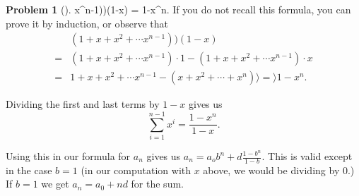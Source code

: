 \documentclass[10pt,]{book}
\theoremstyle{plain}
\theoremstyle{definition}
\newtheorem{activity}[project]{Problem}
\theoremstyle{definition}
\numberwithin{equation}{chapter}
\newcommand{\amp}{&}
\begin{document}
\begin{activity}[]
x^{n-1}))(1-x) = 1-x^n\). If you do not recall this formula, you can prove it by induction, or observe that%
\begin{align*}
\amp (1+x+x^2+\cdots
x^{n-1}))(1-x)\\
=\amp  (1+x+x^2+\cdots
x^{n-1})\cdot 1-(1+x+x^2+\cdots
x^{n-1})\cdot x\\
=\amp  1+x+x^2+\cdots x^{n-1}-(x+x^2+\cdots+x^n)\rangle =\rangle  1-x^n.
\end{align*}
%
\par
Dividing the first and last terms by \(1-x\) gives us%
\begin{equation*}
\sum_{i=1}^{n-1}x^i=\frac{1-x^n}{1-x}.
\end{equation*}
%
\par
Using this in our formula for \(a_n\) gives us \(a_n =a_ob^n+d\frac{1-b^n}{1-b}.\) This is valid except in the case \(b=1\) (in our computation with \(x\) above, we would be dividing by 0.) If \(b=1\) we get \(a_n =a_0 +nd\) for the sum.%
\end{activity}
\typeout{************************************************}
\typeout{************************************************}
\end{document}
